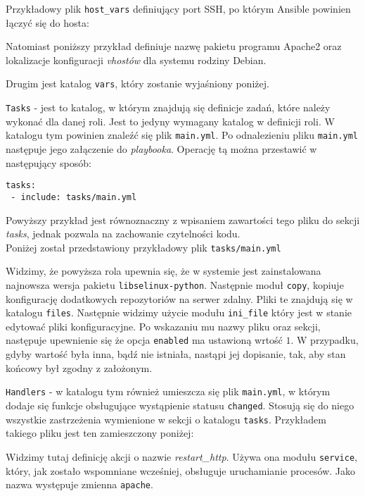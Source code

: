\begin{description}
		Przykładowy plik \texttt{host\_vars} definiujący port SSH, po którym Ansible powinien łączyć się do hosta:
		
		Natomiast poniższy przykład definiuje nazwę pakietu programu Apache2 oraz lokalizacje konfiguracji \textit{vhostów} dla systemu rodziny Debian.
		
		Drugim jest katalog \texttt{vars}, który zostanie wyjaśniony poniżej.
	\item{\texttt{Tasks}} - jest to katalog, w którym znajdują się definicje zadań, które należy wykonać dla danej roli.
		Jest to jedyny wymagany katalog w definicji roli.
		W katalogu tym powinien znaleźć się plik \texttt{main.yml}.
		Po odnalezieniu pliku \texttt{main.yml} następuje jego załączenie do \textit{playbooka}.
		Operację tą można przestawić w następujący sposób:
		\begin{lstlisting}
tasks:
 - include: tasks/main.yml
		\end{lstlisting}
		Powyższy przykład jest równoznaczny z wpisaniem zawartości tego pliku do sekcji \textit{tasks}, jednak pozwala na zachowanie czytelności kodu.\\
		Poniżej został przedstawiony przykładowy plik \texttt{tasks/main.yml}
		
		Widzimy, że powyższa rola upewnia się, że w systemie jest zainstalowana najnowsza wersja pakietu \texttt{libselinux-python}. Następnie moduł \texttt{copy}, kopiuje konfigurację dodatkowych repozytoriów na serwer zdalny.
		Pliki te znajdują się w katalogu \texttt{files}.
		Następnie widzimy użycie modułu \texttt{ini\_file} który jest w stanie edytować pliki konfiguracyjne.
		Po wskazaniu mu nazwy pliku oraz sekcji, następuje upewnienie się że opcja \texttt{enabled} ma ustawioną wrtość $1$.
		W przypadku, gdyby wartość była inna, bądź nie istniała, nastąpi jej dopisanie, tak, aby stan końcowy był zgodny z założonym.
	\item{\texttt{Handlers}} - w katalogu tym również umieszcza się plik \texttt{main.yml}, w którym dodaje się funkcje obsługujące wystąpienie statusu \texttt{changed}.
		Stosują się do niego wszystkie zastrzeżenia wymienione w sekcji o katalogu \texttt{tasks}.
		Przykładem takiego pliku jest ten zamieszczony poniżej:
		
		Widzimy tutaj definicję akcji o nazwie \textit{restart\_http}.
		Używa ona modułu \texttt{service}, który, jak zostało wspomniane wcześniej, obsługuje uruchamianie procesów.
		Jako nazwa występuje zmienna \texttt{apache}.

\end{description}
